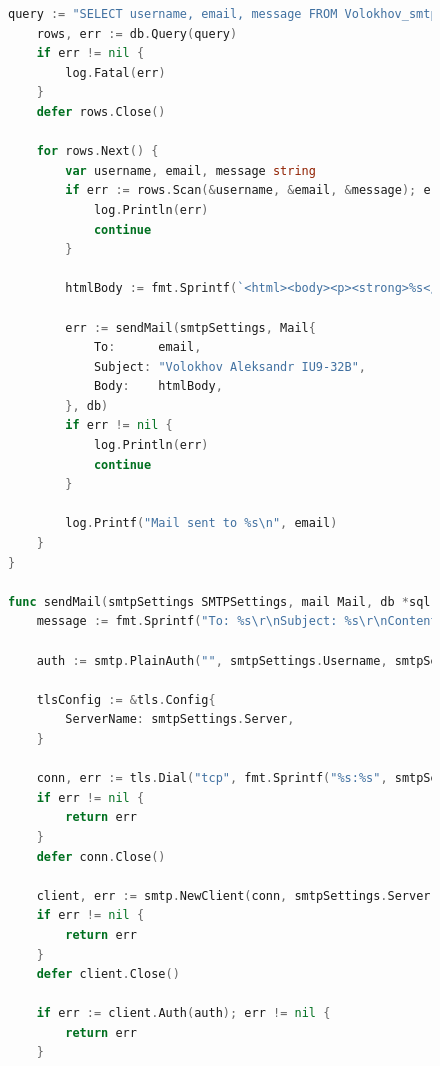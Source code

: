 \documentclass[a4paper, 14pt]{extarticle}
\begin{document}
\newpage
\begin{figure}[!htb]
\begin{lstlisting}[language={Go},caption={app.go - продолжение},label={lst:code3}]
query := "SELECT username, email, message FROM Volokhov_smtp"
	rows, err := db.Query(query)
	if err != nil {
		log.Fatal(err)
	}
	defer rows.Close()

	for rows.Next() {
		var username, email, message string
		if err := rows.Scan(&username, &email, &message); err != nil {
			log.Println(err)
			continue
		}

		htmlBody := fmt.Sprintf(`<html><body><p><strong>%s</strong>,</p><p><em>%s</em></p><p>%s</p></body></html>`, username, message, message)

		err := sendMail(smtpSettings, Mail{
			To:      email,
			Subject: "Volokhov Aleksandr IU9-32B",
			Body:    htmlBody,
		}, db)
		if err != nil {
			log.Println(err)
			continue
		}

		log.Printf("Mail sent to %s\n", email)
	}
}

func sendMail(smtpSettings SMTPSettings, mail Mail, db *sql.DB) error {
	message := fmt.Sprintf("To: %s\r\nSubject: %s\r\nContent-Type: text/html\r\n\r\n%s", mail.To, mail.Subject, mail.Body)

	auth := smtp.PlainAuth("", smtpSettings.Username, smtpSettings.Password, smtpSettings.Server)

	tlsConfig := &tls.Config{
		ServerName: smtpSettings.Server,
	}

	conn, err := tls.Dial("tcp", fmt.Sprintf("%s:%s", smtpSettings.Server, smtpSettings.Port), tlsConfig)
	if err != nil {
		return err
	}
	defer conn.Close()

	client, err := smtp.NewClient(conn, smtpSettings.Server)
	if err != nil {
		return err
	}
	defer client.Close()

	if err := client.Auth(auth); err != nil {
		return err
	}
\end{lstlisting}
\end{figure}
\end{document}
